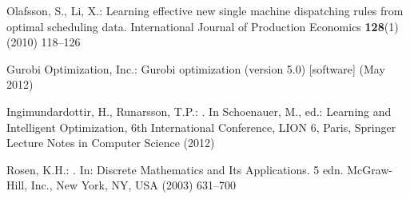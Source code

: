 \documentclass[smallextended]{llncs}
\begin{document}
\begin{thebibliography}{10}
Olafsson, S., Li, X.:
\newblock Learning effective new single machine dispatching rules from optimal
  scheduling data.
\newblock International Journal of Production Economics \textbf{128}(1) (2010)
  118--126

{Gurobi Optimization, Inc.}:
\newblock Gurobi optimization (version 5.0) [software] (May 2012)

Ingimundardottir, H., Runarsson, T.P.:
.
\newblock In Schoenauer, M., ed.: Learning and Intelligent Optimization, 6th
  International Conference, LION 6, Paris, Springer Lecture Notes in Computer
  Science (2012)

Rosen, K.H.:
.
\newblock In: Discrete Mathematics and Its Applications. 5 edn. McGraw-Hill,
  Inc., New York, NY, USA (2003)  631--700

\end{thebibliography}
\end{document}
